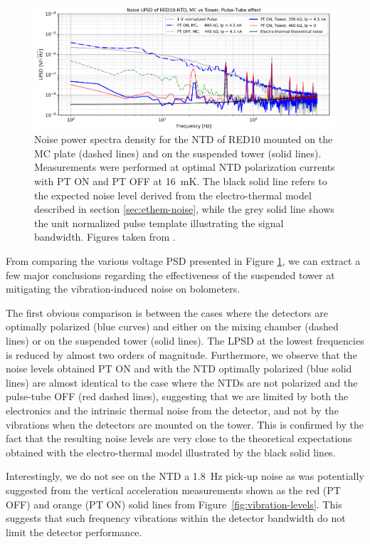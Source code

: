 \begin{figure}
\centering 
\includegraphics[width=\textwidth]{Figures/Experiment/red10_lspd_vibration.pdf}
\caption{Noise power spectra density for the NTD of RED10 mounted on the MC plate (dashed lines) and on the suspended tower (solid lines). Measurements were performed at optimal NTD polarization currents with PT ON and PT OFF at \SI{16}{\milli\kelvin}. The black solid line refers to the expected noise level derived from the electro-thermal model described in section \ref{sec:ethem-noise}, while the grey solid line shows the unit normalized pulse template illustrating the signal bandwidth. Figures taken from \cite{Maisonobe:2018tbq}.}
\label{fig:red10-vibration}
\end{figure}


From comparing the various voltage PSD presented in Figure \ref{fig:red10-vibration}, we can extract a few major conclusions regarding the effectiveness of the suspended tower at mitigating the vibration-induced noise on bolometers. 

The first obvious comparison is between the cases where the detectors are optimally polarized (blue curves) and either on the mixing chamber (dashed lines) or on the suspended tower (solid lines). The LPSD at the lowest frequencies is reduced by almost two orders of magnitude. 
Furthermore, we observe that the noise levels obtained PT ON and with the NTD optimally polarized (blue solid lines) are almost identical to the case where the NTDs are not polarized and the pulse-tube OFF (red dashed lines), suggesting that we are limited by both the electronics and the intrinsic thermal noise from the detector, and not by the vibrations when the detectors are mounted on the tower.
 This is confirmed by the fact that the resulting noise levels are very close to the theoretical expectations obtained with the electro-thermal model illustrated by the black solid lines.

Interestingly, we do not see on the NTD a \SI{1.8}{\Hz} pick-up noise as was potentially suggested from the vertical acceleration measurements shown as the red (PT OFF) and orange (PT ON) solid lines from Figure~\ref{fig:vibration-levels}. This  suggests that such frequency vibrations within the detector bandwidth do not limit the detector performance.

